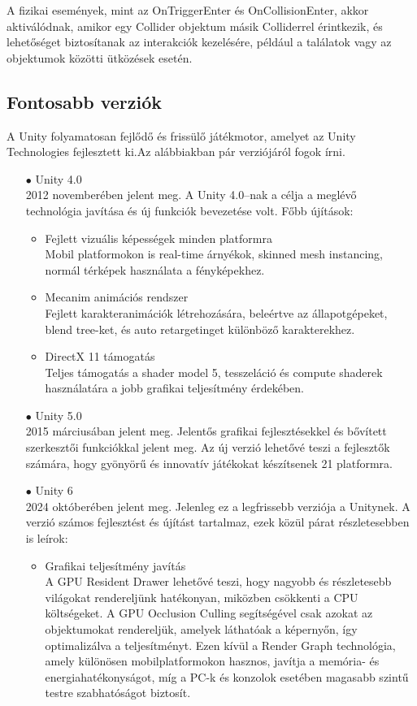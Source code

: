 \documentclass[
]{thesis-ekf}
\theoremstyle{definition}
\theoremstyle{remark}
\begin{document}
A fizikai események, mint az OnTriggerEnter és OnCollisionEnter, akkor aktiválódnak, amikor egy Collider objektum másik Colliderrel érintkezik, és lehetőséget biztosítanak az interakciók kezelésére, például a találatok vagy az objektumok közötti ütközések esetén.\cite{UnityEvents}
\subsection{Fontosabb verziók}
A Unity folyamatosan fejlődő és frissülő játékmotor, amelyet az Unity Technologies fejlesztett ki.Az alábbiakban pár verziójáról fogok írni.
\begin{itemize}
	\item[$\bullet$]Unity 4.0\\2012 novemberében jelent meg. A Unity 4.0--nak a célja a meglévő technológia javítása és új funkciók bevezetése volt. Főbb újítások:
	\begin{itemize}
		\item Fejlett vizuális képességek minden platformra\\Mobil platformokon is real-time árnyékok, skinned mesh instancing, normál térképek használata a fényképekhez.
		\item Mecanim animációs rendszer \\ Fejlett karakteranimációk létrehozására, beleértve az állapotgépeket, blend tree-ket, és auto retargetinget különböző karakterekhez.
		\item DirectX 11 támogatás \\ Teljes támogatás a shader model 5, tesszeláció és compute shaderek használatára a jobb grafikai teljesítmény érdekében.\cite{Unity4.0}
	\end{itemize}
	\item[$\bullet$]Unity 5.0\\2015 márciusában jelent meg. Jelentős grafikai fejlesztésekkel és bővített szerkesztői funkciókkal jelent meg. Az új verzió lehetővé teszi a fejlesztők számára, hogy gyönyörű és innovatív játékokat készítsenek 21 platformra.\cite{Unity5.0}
	\item[$\bullet$]Unity 6\\2024 októberében jelent meg. Jelenleg ez a legfrissebb verziója a Unitynek. A verzió számos fejlesztést és újítást tartalmaz, ezek közül párat részletesebben is leírok:
	\begin{itemize}
		\item Grafikai teljesítmény javítás \\A GPU Resident Drawer lehetővé teszi, hogy nagyobb és részletesebb világokat rendereljünk hatékonyan, miközben csökkenti a CPU költségeket. A GPU Occlusion Culling segítségével csak azokat az objektumokat rendereljük, amelyek láthatóak a képernyőn, így optimalizálva a teljesítményt. Ezen kívül a Render Graph technológia, amely különösen mobilplatformokon hasznos, javítja a memória- és energiahatékonyságot, míg a PC-k és konzolok esetében magasabb szintű testre szabhatóságot biztosít.

\end{itemize}
\end{itemize}
\end{document}
